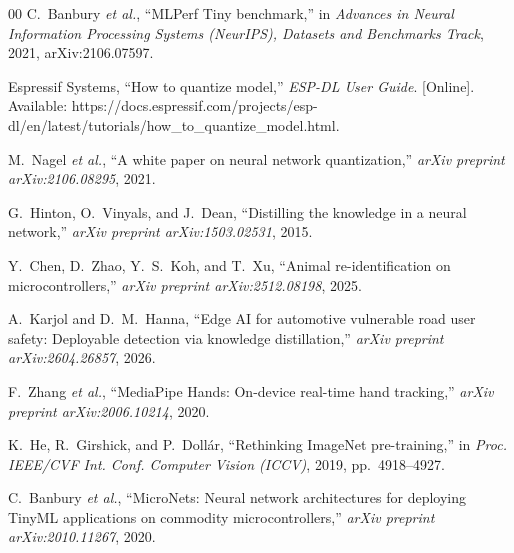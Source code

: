 \documentclass[conference]{IEEEtran}
\begin{document}
\begin{thebibliography}{00}
		C.~Banbury \emph{et al.}, ``MLPerf Tiny benchmark,'' in \emph{Advances in Neural Information Processing Systems (NeurIPS), Datasets and Benchmarks Track}, 2021, arXiv:2106.07597.
		
		Espressif Systems, ``How to quantize model,'' \emph{ESP-DL User Guide}. [Online]. Available: https://docs.espressif.com/projects/esp-dl/en/latest/tutorials/how\_to\_quantize\_model.html.
		
		M.~Nagel \emph{et al.}, ``A white paper on neural network quantization,'' \emph{arXiv preprint arXiv:2106.08295}, 2021.
		
		G.~Hinton, O.~Vinyals, and J.~Dean, ``Distilling the knowledge in a neural network,''
		\emph{arXiv preprint arXiv:1503.02531}, 2015.
		
		Y.~Chen, D.~Zhao, Y.~S.~Koh, and T.~Xu, ``Animal re-identification on microcontrollers,'' \emph{arXiv preprint arXiv:2512.08198}, 2025.
		
		A.~Karjol and D.~M.~Hanna, ``Edge AI for automotive vulnerable road user safety: Deployable
		detection via knowledge distillation,'' \emph{arXiv preprint arXiv:2604.26857}, 2026.
		
		F.~Zhang \emph{et al.}, ``MediaPipe Hands: On-device real-time hand tracking,'' \emph{arXiv preprint arXiv:2006.10214}, 2020.
		
		K.~He, R.~Girshick, and P.~Doll\'ar, ``Rethinking ImageNet pre-training,'' in \emph{Proc. IEEE/CVF Int. Conf. Computer Vision (ICCV)}, 2019, pp.~4918--4927.
		
		C.~Banbury \emph{et al.}, ``MicroNets: Neural network architectures for deploying TinyML applications on commodity microcontrollers,'' \emph{arXiv preprint arXiv:2010.11267}, 2020.
		
	\end{thebibliography}
	
\end{document}
